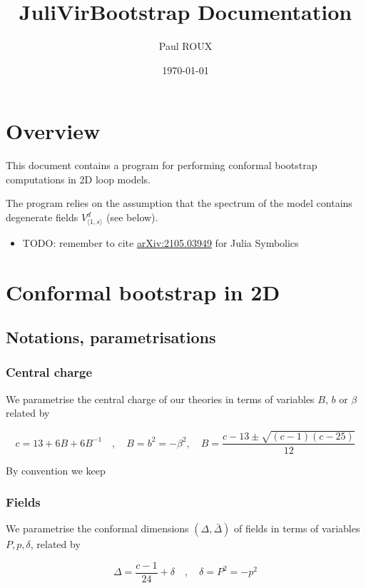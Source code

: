 \documentclass[a4paper]{article}
\author{Paul ROUX}
\date{\today}
\title{JuliVirBootstrap Documentation}
\numberwithin{equation}{section}
\begin{document}
\maketitle
\setcounter{tocdepth}{3}
\tableofcontents

\section{Overview}
\label{sec:org222ff30}

This document contains a program for performing conformal bootstrap computations in 2D loop models.

The program relies on the assumption that the spectrum of the model contains degenerate fields \(V^d_{\langle1,s\rangle}\) (see below).
\begin{itemize}
\item TODO: remember to cite \href{https://arxiv.org/abs/2105.03949}{arXiv:2105.03949} for Julia Symbolics
\label{sec:org996118c}
\end{itemize}
\section{Conformal bootstrap in 2D}
\label{sec:org91b71e5}

\subsection{Notations, parametrisations}
\label{sec:org75571db}

\subsubsection*{Central charge}
\label{sec:org64ec19c}

We parametrise the central charge of our theories in terms of variables \(B\), \(b\) or \(\beta\) related by

\[c = 13 + 6B + 6 B^{-1} \quad , \quad B = b^2 = -\beta^2, \quad B = \frac{c-13 \pm \sqrt{(c-1)(c-25)}}{12}\]

By convention we keep
\subsubsection*{Fields}
\label{sec:org6f0e859}

We parametrise the conformal dimensions \((\Delta, \bar\Delta)\) of fields in terms of variables \(P, p, \delta\), related by

\[
\Delta = \frac{c-1}{24} + \delta  \quad , \quad \delta = P^2 = -p^2
\]
\end{document}
